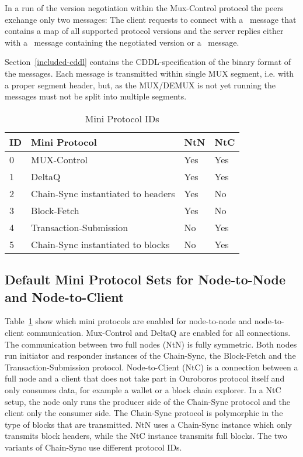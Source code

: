 \documentclass{report}
\newcommand{\hsref}[1]{}
\newcommand{\hide}[1]{}
\theoremstyle{definition}{
  \newtheorem{lemma}{Lemma}[section] %
  \newtheorem{definition}[lemma]{Definition}
}
\theoremstyle{theorem}{
  \newtheorem{invariant}[lemma]{Invariant}
  \newtheorem{proofobligation}[lemma]{Proof Obligation}
}
\numberwithin{equation}{lemma}
\begin{document}
In a run of the version negotiation within the Mux-Control protocol
the peers exchange only two messages:
The client requests to connect with a \InitReq~message that contains a map of all supported
protocol versions
and the server replies either with a \InitRsp~message containing the negotiated version
or a \InitFail~message.

Section~\ref{included-cddl} contains the CDDL-specification of the binary format of the messages.
Each message is transmitted within single MUX segment, i.e. with a proper segment header,
but, as the MUX/DEMUX is not yet running the messages must not be split into multiple segments.

\noindent\hsref{ouroboros-network/src/Ouroboros/Network/Mux/Types.hs}
\newline\hsref{ouroboros-network/src/Ouroboros/Network/NodeToNode.hs}
\newline\hsref{ouroboros-network/src/Ouroboros/Network/NodeToClient.hs}

\hide{Update needed !}
\begin{table}[ht]
\centering
\begin{tabular}{|l|l|l|l|}
  \hline
  ID & Mini Protocol                         & NtN  & NtC \\ \hline
  0  & MUX-Control                           & Yes  & Yes \\ \hline
  1  & DeltaQ                                & Yes  & Yes \\ \hline
  2  & Chain-Sync instantiated to headers    & Yes  & No \\ \hline
  3  & Block-Fetch                           & Yes  & No  \\ \hline
  4  & Transaction-Submission                & No   & Yes  \\ \hline
  5  & Chain-Sync instantiated to blocks     & No   & Yes  \\ \hline
\end{tabular}
\caption{Mini Protocol IDs}
\label{mini-protocol-id}
\end{table}

\subsection{Default Mini Protocol Sets for Node-to-Node and Node-to-Client}
Table~\ref{mini-protocol-id} show which mini protocols are enabled for node-to-node
and node-to-client communication.
Mux-Control and DeltaQ are enabled for all connections.
The communication between two full nodes (NtN) is fully symmetric.
Both nodes run initiator and responder instances of the
Chain-Sync, the Block-Fetch and the Transaction-Submission protocol.
Node-to-Client (NtC) is a connection between a full node and a client that does not take part in
Ouroboros protocol itself and only consumes data, for example a wallet or a block chain explorer.
In a NtC setup, the node only runs the producer side of the Chain-Sync protocol and the client only the
consumer side.
The Chain-Sync protocol is polymorphic in the type of blocks that are transmitted.
NtN uses a Chain-Sync instance which only transmits block headers, while the NtC instance transmits
full blocks.
The two variants of Chain-Sync use different protocol IDs.
\end{document}
